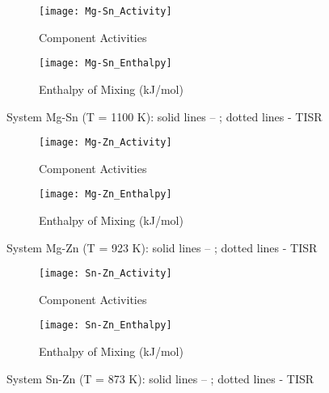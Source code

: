 \documentclass[12pt,abstract]{scrartcl}
\begin{document}
\begin{figure}
\centering
\begin{subfigure}{.5\textwidth}
  \centering
  \texttt{[image: Mg-Sn\_Activity]}
  \caption{Component Activities}
  \label{fig:sub1}
\end{subfigure}%
\begin{subfigure}{.5\textwidth}
  \centering
  \texttt{[image: Mg-Sn\_Enthalpy]}
  \caption{Enthalpy of Mixing (kJ/mol)}
  \label{fig:sub2}
\end{subfigure}
\caption{System Mg-Sn (T = 1100 K): solid lines -- \cite{Ghosh2012}; dotted lines - TISR}
\label{fig:Mg-Sn}
\end{figure}


\begin{figure}
\centering
\begin{subfigure}{.5\textwidth}
  \centering
  \texttt{[image: Mg-Zn\_Activity]}
  \caption{Component Activities}
  \label{fig:sub1}
\end{subfigure}%
\begin{subfigure}{.5\textwidth}
  \centering
  \texttt{[image: Mg-Zn\_Enthalpy]}
  \caption{Enthalpy of Mixing (kJ/mol)}
  \label{fig:sub2}
\end{subfigure}
\caption{System Mg-Zn (T = 923 K): solid lines -- \cite{Ghosh2012}; dotted lines - TISR}
\label{fig:Mg-Zn}
\end{figure}


\begin{figure}
\centering
\begin{subfigure}{.5\textwidth}
  \centering
  \texttt{[image: Sn-Zn\_Activity]}
  \caption{Component Activities}
  \label{fig:sub1}
\end{subfigure}%
\begin{subfigure}{.5\textwidth}
  \centering
  \texttt{[image: Sn-Zn\_Enthalpy]}
  \caption{Enthalpy of Mixing (kJ/mol)}
  \label{fig:sub2}
\end{subfigure}
\caption{System Sn-Zn (T = 873 K): solid lines -- \cite{Ghosh2012}; dotted lines - TISR}
\label{fig:Sn-Zn}
\end{figure}
\end{document}
